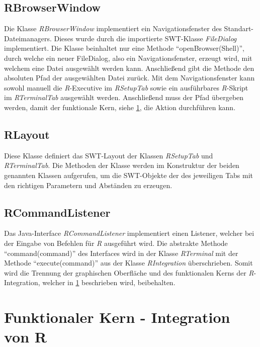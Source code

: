 \documentclass[a4paper, 12pt]{report} %
\begin{document}
\subsection{RBrowserWindow} \label{RBrowserWindow} 

Die Klasse \textit{RBrowserWindow} implementiert ein Navigationsfenster des Standart-Dateimanagers. 
Dieses wurde durch die importierte SWT-Klasse \textit{FileDialog} implementiert. Die Klasse beinhaltet nur eine Methode "`openBrowser(Shell)"', durch welche ein neuer FileDialog, also ein Navigationsfenster, erzeugt wird, mit welchem eine Datei ausgewählt werden kann. Anschließend gibt die Methode den absoluten Pfad der ausgewählten Datei zurück. 
Mit dem Navigationsfenster kann sowohl manuell die \textit{R}-Executive im \textit{RSetupTab} sowie ein ausführbares \textit{R}-Skript im \textit{RTerminalTab} ausgewählt werden. Anschließend muss der Pfad übergeben werden, damit der funktionale Kern, siehe \ref{funktionaler Kern}, die Aktion durchführen kann.

\subsection{RLayout}

Diese Klasse definiert das SWT-Layout der Klassen \textit{RSetupTab} und \textit{RTerminalTab}. 
Die Methoden der Klasse werden im Konstruktur der beiden genannten Klassen aufgerufen, um die SWT-Objekte der des jeweiligen Tabs mit den richtigen Parametern und Abständen zu erzeugen.

\subsection{RCommandListener} \label{RCommandListener}

Das Java-Interface \textit{RCommandListener} implementiert einen Listener, welcher bei der Eingabe von Befehlen für \textit{R} ausgeführt wird. Die abstrakte Methode "`command(command)"' des Interfaces wird in der Klasse \textit{RTerminal} mit der Methode "`execute(command)"' aus der Klasse \textit{RIntegration} überschrieben. Somit wird die Trennung der graphischen Oberfläche und des funktionalen Kerns der \textit{R}-Integration, welcher in \ref{funktionaler Kern} beschrieben wird, beibehalten.


\section{Funktionaler Kern - Integration von R} \label{funktionaler Kern}
\end{document}
